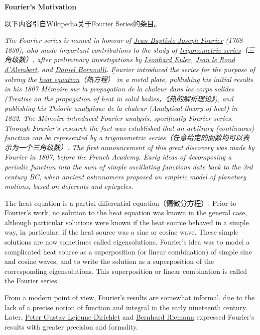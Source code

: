 \begin{shaded}
	{\bf Fourier's Motivation}
	
	以下内容引自Wikipedia关于Fourier Series的条目。
	
	{\it
		The Fourier series is named in honour of \underline{Jean-Baptiste Joseph 
		Fourier} (1768–1830), who made important contributions to the 
		study of \underline{trigonometric series}（三角级数）, after preliminary
		investigations by \underline{Leonhard Euler}, 
		\underline{Jean le Rond d'Alembert}, and \underline{Daniel Bernoulli}.
		{\b Fourier introduced the series for the purpose of solving the 
		\underline{heat equation}（热方程） in a metal plate}, publishing his initial
		results in his 1807 Mémoire sur la propagation de la chaleur dans 
		les corps solides (Treatise on the propagation of heat in 
		solid bodies，《热的解析理论》), and publishing his Théorie analytique de 
		la chaleur (Analytical theory of heat) in 1822. The Mémoire 
		introduced Fourier analysis, specifically Fourier series. 
		Through Fourier's research the fact was established that 
		an arbitrary (continuous) function can be represented by 
		a trigonometric series（任意给定的函数均可以表示为一个三角级数）. 
		The first announcement of this 
		great discovery was made by Fourier in 1807, before the 
		French Academy. Early ideas of decomposing a periodic 
		function into the sum of simple oscillating functions date 
		back to the 3rd century BC, when ancient astronomers proposed 
		an empiric model of planetary motions, based on deferents and 
		epicycles.

		The heat equation is a partial differential equation（偏微分方程）. 
		Prior to Fourier's work, no solution to the heat equation 
		was known in the general case, although particular solutions 
		were known if the heat source behaved in a simple way, in 
		particular, if the heat source was a sine or cosine wave. 
		These simple solutions are now sometimes called eigensolutions. 
		Fourier's idea was to model a complicated heat source as a 
		superposition (or linear combination) of simple sine and 
		cosine waves, and to write the solution as a superposition 
		of the corresponding eigensolutions. This superposition or 
		linear combination is called the Fourier series.
		
		From a modern point of view, Fourier's results are somewhat 
		informal, due to the lack of a precise notion of function and 
		integral in the early nineteenth century. Later, \underline{Peter 
		Gustav Lejeune Dirichlet} and \underline{Bernhard Riemann} expressed Fourier's 
		results with greater precision and formality.
		
}
\end{shaded}
